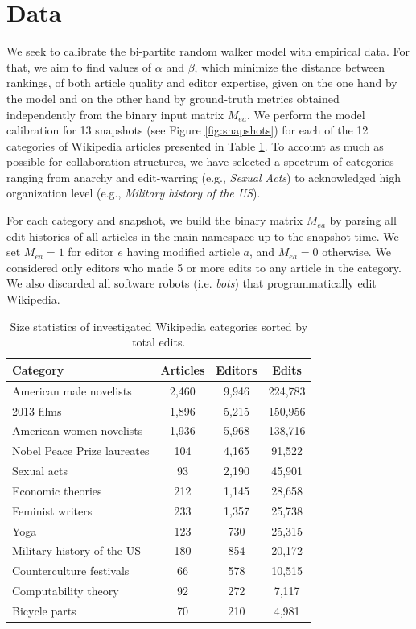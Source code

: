 \section{Data}
We seek to calibrate the bi-partite random walker model with empirical data. For that, we aim to find values of $\alpha$ and $\beta$, which minimize the distance between rankings, of both article quality and editor expertise, given on the one hand by the model and on the other hand by ground-truth metrics obtained independently from the binary input matrix $M_{ea}$. We perform the model calibration for 13 snapshots (see Figure \ref{fig:snapshots})  for each of  the 12 categories of Wikipedia articles presented in Table \nolinebreak \ref{tab:statistics}. To account as much as possible for collaboration structures, we have selected a spectrum of categories ranging from anarchy and edit-warring (e.g., {\it Sexual Acts}) to acknowledged high organization level (e.g., {\it Military history of the US}).

For each category and snapshot, we build the binary matrix $M_{ea}$ by parsing all edit histories of all articles in the main namespace up to the snapshot time. We set $M_{ea} = 1$ for editor $e$ having modified article $a$, and $M_{ea} = 0$ otherwise. We considered only editors who made 5 or more edits to any article in the category. We also discarded all software robots (i.e. {\it bots}) that programmatically edit Wikipedia. 

\begin{table}
\begin{tabular}{|l|c|c|c|}
\hline
{\bf Category} &  {\bf Articles} &  {\bf Editors} &  {\bf Edits} \\
\hline
American male novelists               &      2,460 &   9,946 &  224,783 \\
2013 films                            &      1,896 &   5,215 &  150,956 \\
American women novelists              &      1,936 &   5,968 &  138,716 \\
Nobel Peace Prize laureates           &       104 &   4,165 &   91,522 \\
Sexual acts                           &        93 &   2,190 &   45,901 \\
Economic theories                     &       212 &   1,145 &   28,658 \\
Feminist writers                      &       233 &   1,357 &   25,738 \\
Yoga                                  &       123 &    730 &   25,315 \\
Military history of the US &       180 &    854 &   20,172 \\
Counterculture festivals              &        66 &    578 &   10,515 \\
Computability theory                  &        92 &    272 &    7,117 \\
Bicycle parts                         &        70 &    210 &    4,981 \\
\hline
\end{tabular}
\caption{Size statistics of investigated Wikipedia categories sorted by total edits.}
\label{tab:statistics}
\end{table}

